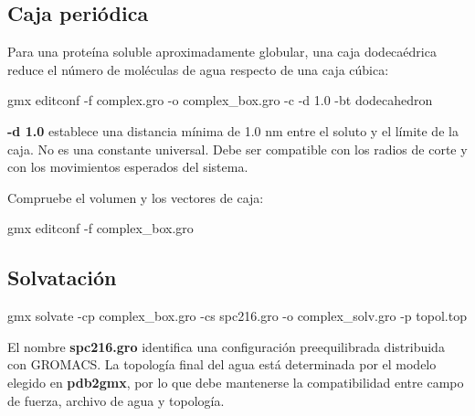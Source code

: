 \documentclass[
  spanish,
  11pt,
  a4paper]{article}
\newenvironment{Shaded}{\begin{snugshade}}{\end{snugshade}}
\newcommand{\AttributeTok}[1]{\textcolor[rgb]{0.13,0.29,0.53}{#1}}
\newcommand{\ExtensionTok}[1]{#1}
\newcommand{\NormalTok}[1]{#1}
\begin{document}
\subsection{Caja periódica}\label{caja-periuxf3dica}

Para una proteína soluble aproximadamente globular, una caja
dodecaédrica reduce el número de moléculas de agua respecto de una caja
cúbica:

\begin{Shaded}
\begin{Highlighting}[]
\ExtensionTok{gmx}\NormalTok{ editconf     }\AttributeTok{{-}f}\NormalTok{ complex.gro     }\AttributeTok{{-}o}\NormalTok{ complex\_box.gro     }\AttributeTok{{-}c}     \AttributeTok{{-}d}\NormalTok{ 1.0     }\AttributeTok{{-}bt}\NormalTok{ dodecahedron}
\end{Highlighting}
\end{Shaded}

\textbf{-d 1.0} establece una distancia mínima de 1.0 nm entre el soluto
y el límite de la caja. No es una constante universal. Debe ser
compatible con los radios de corte y con los movimientos esperados del
sistema.

Compruebe el volumen y los vectores de caja:

\begin{Shaded}
\begin{Highlighting}[]
\ExtensionTok{gmx}\NormalTok{ editconf }\AttributeTok{{-}f}\NormalTok{ complex\_box.gro}
\end{Highlighting}
\end{Shaded}

\subsection{Solvatación}\label{solvataciuxf3n}

\begin{Shaded}
\begin{Highlighting}[]
\ExtensionTok{gmx}\NormalTok{ solvate     }\AttributeTok{{-}cp}\NormalTok{ complex\_box.gro     }\AttributeTok{{-}cs}\NormalTok{ spc216.gro     }\AttributeTok{{-}o}\NormalTok{ complex\_solv.gro     }\AttributeTok{{-}p}\NormalTok{ topol.top}
\end{Highlighting}
\end{Shaded}

El nombre \textbf{spc216.gro} identifica una configuración
preequilibrada distribuida con GROMACS. La topología final del agua está
determinada por el modelo elegido en \textbf{pdb2gmx}, por lo que debe
mantenerse la compatibilidad entre campo de fuerza, archivo de agua y
topología.
\end{document}
